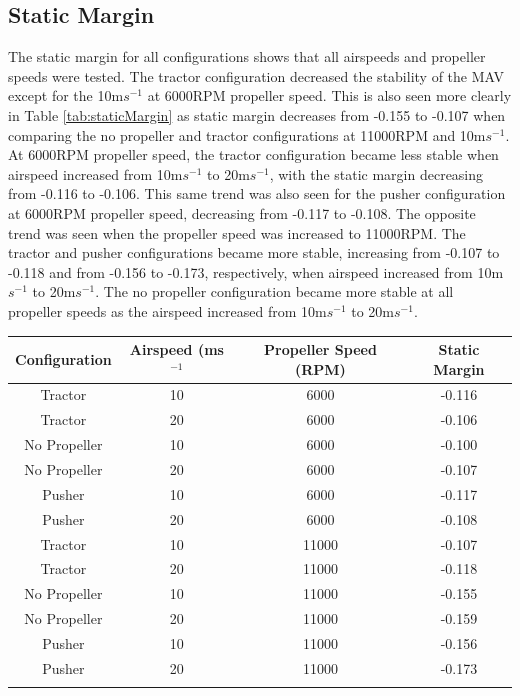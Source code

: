 \subsection{Static Margin}
The static margin for all configurations shows that all airspeeds and propeller speeds were tested. The tractor configuration decreased the stability of the MAV except for the 10m$s^{-1}$ at 6000RPM propeller speed. This is also seen more clearly in Table \ref{tab:staticMargin} as static margin decreases from -0.155 to -0.107 when comparing the no propeller and tractor configurations at 11000RPM and  10m$s^{-1}$. At 6000RPM propeller speed, the tractor configuration became less stable when airspeed increased from 10m$s^{-1}$ to 20m$s^{-1}$, with the static margin decreasing from -0.116 to -0.106. This same trend was also seen for the pusher configuration at 6000RPM propeller speed, decreasing from -0.117 to -0.108. The opposite trend was seen when the propeller speed was increased to 11000RPM. The tractor and pusher configurations became more stable, increasing from -0.107 to -0.118 and from -0.156 to -0.173, respectively, when airspeed increased from 10m$s^{-1}$ to 20m$s^{-1}$. The no propeller configuration became more stable at all propeller speeds as the airspeed increased from 10m$s^{-1}$ to 20m$s^{-1}$.


\begin{tabular}{ |c|c|c|c| }
 \hline

 \hline
 Configuration & Airspeed (ms$^{-1}$ &  Propeller Speed (RPM) & Static Margin\\
 \hline
 Tractor & 10 & 6000 & -0.116 \\
 Tractor & 20 & 6000 & -0.106\\
No Propeller & 10 & 6000 & -0.100\\
  No Propeller & 20 & 6000 & -0.107 \\
 Pusher & 10 & 6000 & -0.117 \\
  Pusher & 20 & 6000 & -0.108 \\
  \hline
 Tractor & 10 & 11000 & -0.107 \\
 Tractor & 20 & 11000 & -0.118\\
 No Propeller & 10 & 11000 & -0.155\\
 No Propeller& 20 & 11000 & -0.159\\
 Pusher & 10 & 11000 & -0.156 \\
 Pusher & 20 & 11000 & -0.173 \\
 \hline
 \label{tab:staticMargin}
\end{tabular}



